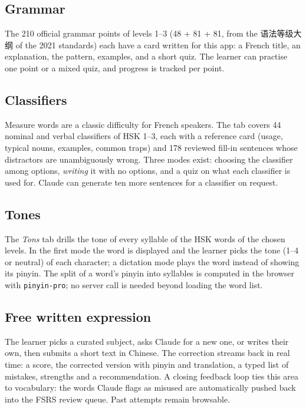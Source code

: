 \documentclass[11pt,a4paper]{article}
\newcommand{\han}[1]{{#1}}
\begin{document}
\subsection{Grammar}

The 210 official grammar points of levels 1--3 (48 + 81 + 81, from the
\han{语法等级大纲} of the 2021 standards) each have a card written for this app: a
French title, an explanation, the pattern, examples, and a short quiz. The
learner can practise one point or a mixed quiz, and progress is tracked per
point.

\subsection{Classifiers}

Measure words are a classic difficulty for French speakers. The tab covers 44
nominal and verbal classifiers of HSK 1--3, each with a reference card (usage,
typical nouns, examples, common traps) and 178 reviewed fill-in sentences whose
distractors are unambiguously wrong. Three modes exist: choosing the classifier
among options, \emph{writing} it with no options, and a quiz on what each
classifier is used for. Claude can generate ten more sentences for a classifier
on request.

\subsection{Tones}

The \emph{Tons} tab drills the tone of every syllable of the HSK words of the
chosen levels. In the first mode the word is displayed and the learner picks
the tone (1--4 or neutral) of each character; a dictation mode plays the word
instead of showing its pinyin. The split of a word's pinyin into syllables is
computed in the browser with \texttt{pinyin-pro}; no server call is needed
beyond loading the word list.

\subsection{Free written expression}

The learner picks a curated subject, asks Claude for a new one, or writes their
own, then submits a short text in Chinese. The correction streams back in real
time: a score, the corrected version with pinyin and translation, a typed list
of mistakes, strengths and a recommendation. A closing feedback loop ties this
area to vocabulary: the words Claude flags as misused are automatically pushed
back into the FSRS review queue. Past attempts remain browsable.
\end{document}
